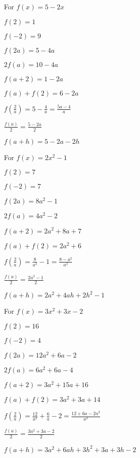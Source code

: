 \begin{tasks}
\task For $f(x) = 5-2x$

\begin{shortitemize}
\item  $f(2) = 1$
\item  $f(-2) = 9$
\item  $f(2a) = 5-4a$
\item  $2 f(a) = 10-4a$
\item $f(a+2) = 1-2a$
\item $f(a) + f(2) = 6-2a$
\item  $f \left( \frac{2}{a} \right) = 5 - \frac{4}{a} = \frac{5a-4}{a}$
\item $\frac{f(a)}{2} = \frac{5-2a}{2}$
\item  $f(a + h) = 5-2a-2h$
\end{shortitemize}

\task For $f(x) = 2x^2-1$

\begin{shortitemize}
\item $f(2) = 7$
\item $f(-2) = 7$
\item $f(2a) = 8a^2-1$
\item $2 f(a) = 4a^2-2$
\item $f(a+2) = 2a^2+8a+7$
\item $f(a) + f(2) = 2a^2+6$
\item $f \left( \frac{2}{a} \right) = \frac{8}{a^2} - 1 = \frac{8-a^2}{a^2}$
\item $\frac{f(a)}{2} =  \frac{2a^2-1}{2}$
\item $f(a + h) = 2a^2+4ah+2h^2-1$
\end{shortitemize}

\task For $f(x) = 3x^2+3x-2$

\begin{shortitemize}
\item  $f(2) = 16$
\item  $f(-2) = 4$
\item  $f(2a) = 12a^2+6a-2$
\item  $2 f(a) = 6a^2+6a-4$
\item $f(a+2) = 3a^2+15a+16$
\item \small $f(a) + f(2) = 3a^2+3a+14$ \normalsize
\item  $f \left( \frac{2}{a} \right) = \frac{12}{a^2} + \frac{6}{a} - 2 = \frac{12+6a-2a^2}{a^2}$
\item $\frac{f(a)}{2} =  \frac{3a^2+3a-2}{2}$
\item  $f(a + h) = 3a^2 + 6ah + 3h^2+3a+3h-2$
\end{shortitemize}


\end{tasks}
